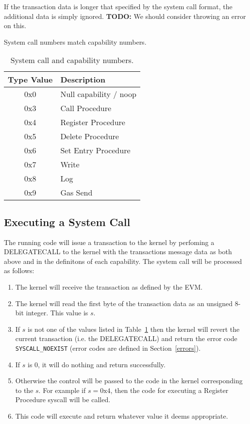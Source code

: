\documentclass[english,a4paper]{article}
\begin{document}
If the transaction data is longer that specified by the system call format, the
additional data is simply ignored. \textbf{TODO:} We should consider throwing an
error on this.

System call numbers match capability numbers.

\begin{table}[H]
  \caption{System call and capability numbers.\label{syscall-numbers}}
  \centering{}%
  \begin{tabularx}{\textwidth}{c|X}
    \hline
    Type Value & Description\\
    \hline
    \hline
    0x0 & Null capability / noop \\
    0x3 & Call Procedure \\
    0x4 & Register Procedure \\
    0x5 & Delete Procedure \\
    0x6 & Set Entry Procedure \\
    0x7 & Write \\
    0x8 & Log \\
    0x9 & Gas Send \\
    \hline
  \end{tabularx}
\end{table}

\subsection{Executing a System Call}
The running code will issue a transaction to the kernel by perfoming a
DELEGATECALL to the kernel with the transactions message data as both above and
in the definitons of each capability. The system call will be processed as
follows:

\begin{enumerate}
  \item The kernel will receive the transaction as defined by the EVM.
  \item The kernel will read the first byte of the transaction data as an
  unsigned 8-bit integer. This value is $s$.
  \item If $s$ is not one of the values listed in Table~\ref{syscall-numbers}
  then the kernel will revert the current transaction (i.e. the DELEGATECALL)
  and return the error code \texttt{SYSCALL\_NOEXIST} (error codes are defined
  in Section~\ref{errors}).
  \item If $s$ is 0, it will do nothing and return successfully.
  \item Otherwise the control will be passed to the code in the kernel
  corresponding to the $s$. For example if $s = \text{0x4}$, then the code for
  executing a Register Procedure syscall will be called.
  \item This code will execute and return whatever value it deems appropriate.
\end{enumerate}
\end{document}
